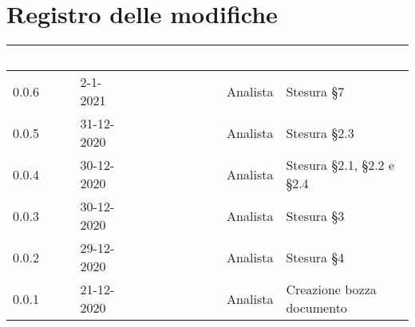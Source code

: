 \section*{Registro delle modifiche}
\setcounter{table}{-1}
{
\renewcommand{\arraystretch}{1.5}
\centering
\begin{longtable}{C{1.7cm} C{2.5cm} C{3.2cm} C{2.7cm} C{4.8cm}}
\textcolor{white}{\textbf{Versione}}&
\textcolor{white}{\textbf{Data}}&
\textcolor{white}{\textbf{Nominativo}}&
\textcolor{white}{\textbf{Ruolo}}&
\textcolor{white}{\textbf{Descrizione}}\\	
\endhead

0.0.6 & 2-1-2021 & \BM{} & Analista & Stesura \S 7 \\
0.0.5 & 31-12-2020 & \BM{} & Analista & Stesura \S 2.3 \\
0.0.4 & 30-12-2020 & \PA{} & Analista & Stesura \S 2.1, \S 2.2 e \S 2.4 \\
0.0.3 & 30-12-2020 & \ZM{} & Analista & Stesura \S 3\\
0.0.2 & 29-12-2020 & \RA{} & Analista & Stesura \S 4 \\
0.0.1 & 21-12-2020 & \ZM{} & Analista & Creazione bozza documento \\	
\end{longtable}
}
